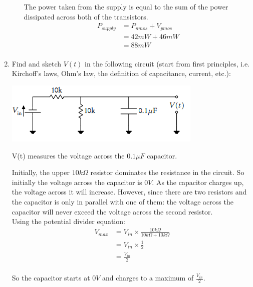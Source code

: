 \documentclass[10pt,\jkfside,a4paper]{article}
\begin{document}
\begin{enumerate}
\begin{enumerate}
The power taken from the supply is equal to the sum of the power dissipated across both of 
the transistors.
\begin{equation}
\begin{split}
P_{supply}&=P_{nmos} + V_{pmos}\\
		&=42mW + 46mW\\
		&=88mW\\
\end{split}
\end{equation}

\end{enumerate}

\item{Find and sketch $V(t)$ in the following circuit (start from first 
principles, i.e. Kirchoff’s laws, Ohm’s law, the definition of capacitance, 
current, etc.):}

\begin{center}
\includegraphics{7x}
\end{center}

V(t) measures the voltage across the $0.1\mu F$ capacitor.

Initially, the upper $10k\Omega$ resistor dominates the resistance in the circuit. 
So initially the voltage across the capacitor is $0V$. As the capacitor charges up, 
the voltage across it will increase. However, since there are two resistors and the 
capacitor is only in parallel with one of them: the voltage across the capacitor will never 
exceed the voltage across the second resistor.\\
Using the potential divider equation: 
\begin{equation}
\begin{split}
V_{max} &= V_{in} \times \frac{10k\Omega}{10k\Omega + 10k\Omega}\\
		&= V_{in} \times \frac{1}{2}\\
		&= \frac{V_{in}}{2}\\
\end{split}
\end{equation}

So the capacitor starts at $0V$ and charges to a maximum of $\frac{V_{in}}{2}$. 


\end{enumerate}
\end{document}
